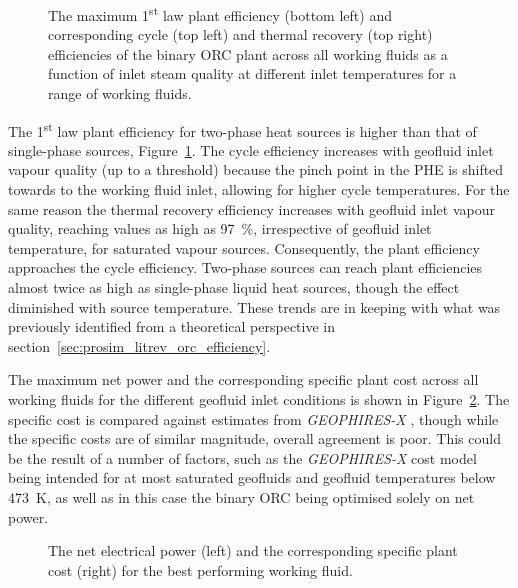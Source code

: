     \begin{figure}[H]
        \centering
        
        \caption[The 1\textsuperscript{st} law cycle, thermal recovery and plant efficiency of the binary ORC plant.]{The maximum 1\textsuperscript{st} law plant efficiency (bottom left) and corresponding cycle (top left) and thermal recovery (top right) efficiencies of the binary ORC plant across all working fluids as a function of inlet steam quality at different inlet temperatures for a range of working fluids.}
        \label{fig:prosim_purewater_eta1st_by_temp}
    \end{figure}

    The 1\textsuperscript{st} law plant efficiency for two-phase heat sources is higher than that of single-phase sources, Figure~\ref{fig:prosim_purewater_eta1st_by_temp}. The cycle efficiency increases with geofluid inlet vapour quality (up to a threshold) because the pinch point in the \ac{PHE} is shifted towards to the working fluid inlet, allowing for higher cycle temperatures. For the same reason the thermal recovery efficiency increases with geofluid inlet vapour quality, reaching values as high as \qty{97}{\percent}, irrespective of geofluid inlet temperature, for saturated vapour sources. Consequently, the plant efficiency approaches the cycle efficiency. Two-phase sources can reach plant efficiencies almost twice as high as single-phase liquid heat sources, though the effect diminished with source temperature. These trends are in keeping with what was previously identified from a theoretical perspective in section~\ref{sec:prosim_litrev_orc_efficiency}. 

    The maximum net power and the corresponding specific plant cost across all working fluids for the different geofluid inlet conditions is shown in Figure~\ref{fig:prosim_purewater_Wnet_bestWf_SpecCost}. The specific cost is compared against estimates from \emph{GEOPHIRES-X} \cite{Beckers2023}, though while the specific costs are of similar magnitude, overall agreement is poor. This could be the result of a number of factors, such as the \emph{GEOPHIRES-X} cost model being intended for at most saturated geofluids and geofluid temperatures below \qty{473}{\K}, as well as in this case the binary \ac{ORC} being optimised solely on net power.

    \begin{figure}[H]
        \centering
        
        \caption[The net electrical power and the corresponding specific plant cost for the best performing working fluid.]{The net electrical power (left) and the corresponding specific plant cost (right) for the best performing working fluid.}
        \label{fig:prosim_purewater_Wnet_bestWf_SpecCost}
    \end{figure}

